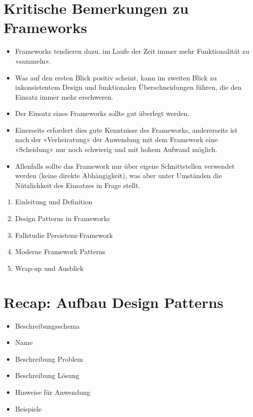 \section*{Kritische Bemerkungen zu Frameworks}
\begin{itemize}
  \item Frameworks tendieren dazu, im Laufe der Zeit immer mehr Funktionalität zu «sammeln».
  \item Was auf den ersten Blick positiv scheint, kann im zweiten Blick zu inkonsistentem Design und funktionalen Überschneidungen führen, die den Einsatz immer mehr erschweren.
  \item Der Einsatz eines Frameworks sollte gut überlegt werden.
  \item Einerseits erfordert dies gute Kenntnisse des Frameworks, andererseits ist nach der «Verheiratung» der Anwendung mit dem Framework eine «Scheidung» nur noch schwierig und mit hohem Aufwand möglich.
  \item Allenfalls sollte das Framework nur über eigene Schnittstellen verwendet werden (keine direkte Abhängigkeit), was aber unter Umständen die Nützlichkeit des Einsatzes in Frage stellt.
\end{itemize}

\begin{enumerate}
  \item Einleitung und Definition
  \item Design Patterns in Frameworks
  \item Fallstudie Persistenz-Framework
  \item Moderne Framework Patterns
  \item Wrap-up und Ausblick
\end{enumerate}

\section*{Recap: Aufbau Design Patterns}
\begin{itemize}
  \item Beschreibungsschema
  \item Name
  \item Beschreibung Problem
  \item Beschreibung Lösung
  \item Hinweise für Anwendung
  \item Beispiele
\end{itemize}

